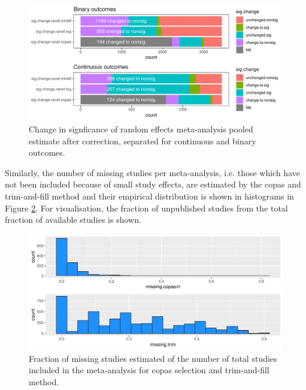 \documentclass[11pt,a4paper,twoside]{book}\usepackage[]{graphicx}\usepackage[]{color}
\newenvironment{knitrout}{}{} %
\begin{document}
\begin{figure}
\begin{knitrout}
\color{fgcolor}

{\centering \includegraphics[width=\textwidth-3cm]{figure/ch02_figunnamed-chunk-39-1} 

}



\end{knitrout}
\caption{Change in signficance of random effects meta-analysis pooled estimate after correction, separated for continuous and binary outcomes.}
\label{significance.change.random}
\end{figure}

Similarly, the number of missing studies per meta-analysis, i.e. those which have not been included because of small study effects, are estimated by the copas and trim-and-fill method and their empirical distribution is shown in histograms in Figure \ref{missing.studies.distribution}. For visualisation, the fraction of unpublished studies from the total fraction of available studies is shown.

\begin{figure}
\begin{knitrout}
\color{fgcolor}

{\centering \includegraphics[width=\textwidth-3cm]{figure/ch02_figunnamed-chunk-40-1} 

}



\end{knitrout}
\caption{Fraction of missing studies estimated of the number of total studies included in the meta-analysis for copas selection and trim-and-fill method.}
\label{missing.studies.distribution}
\end{figure}
\end{document}
